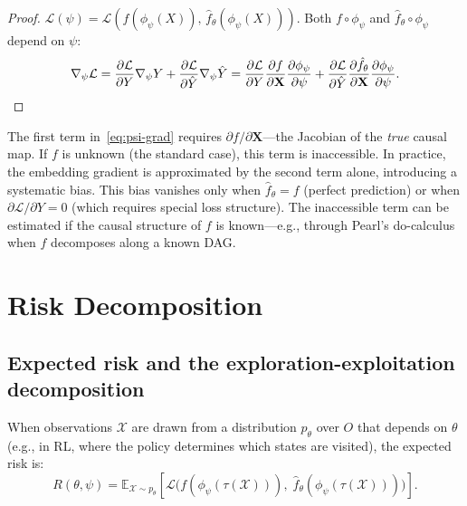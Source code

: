 \begin{proof}
$\mathcal{L}(\psi) = \mathcal{L}(f(\phi_\psi(X)),\, \hat{f}_\theta(\phi_\psi(X)))$. Both $f \circ \phi_\psi$ and $\hat{f}_\theta \circ \phi_\psi$ depend on $\psi$:
\[
    \nabla_\psi \mathcal{L} = \frac{\partial \mathcal{L}}{\partial Y} \nabla_\psi Y + \frac{\partial \mathcal{L}}{\partial \hat{Y}} \nabla_\psi \hat{Y} = \frac{\partial \mathcal{L}}{\partial Y} \frac{\partial f}{\partial \mathbf{X}} \frac{\partial \phi_\psi}{\partial \psi} + \frac{\partial \mathcal{L}}{\partial \hat{Y}} \frac{\partial \hat{f}_\theta}{\partial \mathbf{X}} \frac{\partial \phi_\psi}{\partial \psi}. \qedhere
\]
\end{proof}

\begin{remark}
\label{rem:inaccessible}
The first term in~\eqref{eq:psi-grad} requires $\partial f / \partial \mathbf{X}$---the Jacobian of the \emph{true} causal map. If $f$ is unknown (the standard case), this term is inaccessible. In practice, the embedding gradient is approximated by the second term alone, introducing a systematic bias. This bias vanishes only when $\hat{f}_\theta = f$ (perfect prediction) or when $\partial \mathcal{L}/\partial Y = 0$ (which requires special loss structure). The inaccessible term can be estimated if the causal structure of $f$ is known---e.g., through Pearl's do-calculus when $f$ decomposes along a known DAG.
\end{remark}


\section{Risk Decomposition}
\label{sec:risk-decomp}

\subsection{Expected risk and the exploration-exploitation decomposition}

When observations $\mathcal{X}$ are drawn from a distribution $p_\theta$ over $O$ that depends on $\theta$ (e.g., in RL, where the policy determines which states are visited), the expected risk is:
\begin{equation}
\label{eq:expected-risk}
    R(\theta, \psi) = \mathbb{E}_{\mathcal{X} \sim p_\theta}\!\left[\mathcal{L}\bigl(f(\phi_\psi(\tau(\mathcal{X}))),\; \hat{f}_\theta(\phi_\psi(\tau(\mathcal{X})))\bigr)\right].
\end{equation}

